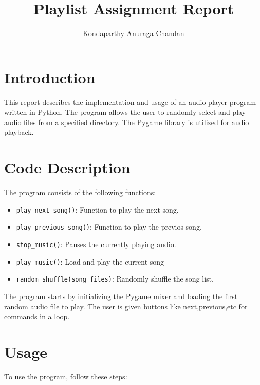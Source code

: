 \documentclass{article}
\begin{document}
\title{Playlist Assignment Report}
\author{Kondaparthy Anuraga Chandan}

\maketitle

\section{Introduction}
This report describes the implementation and usage of an audio player program written in Python. The program allows the user to randomly select and play audio files from a specified directory. The Pygame library is utilized for audio playback.

\section{Code Description}
The program consists of the following functions:

\begin{itemize}
  \item \texttt{play\_next\_song()}: Function to play the next song.

  \item \texttt{play\_previous\_song()}: Function to play the previos song.

  \item \texttt{stop\_music()}: Pauses the currently playing audio.
  \item \texttt{play\_music()}: Load and play the current song

  \item \texttt{random\_shuffle(song\_files)}: Randomly shuffle the song list.
\end{itemize}

The program starts by initializing the Pygame mixer and loading the first random audio file to play. The user is given buttons like next,previous,etc for commands in a loop.

\section{Usage}
To use the program, follow these steps:
\end{document}

